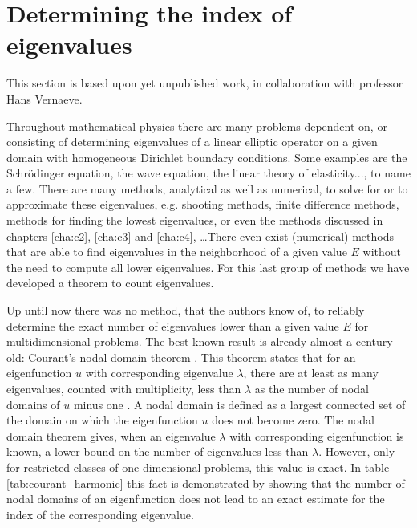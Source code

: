 \section{Determining the index of eigenvalues}\label{sec:c3_index_of_e}

This section is based upon yet unpublished work, in collaboration with professor Hans Vernaeve.


Throughout mathematical physics there are many problems dependent on, or consisting of determining eigenvalues of a linear elliptic operator on a given domain with homogeneous Dirichlet boundary conditions. Some examples are the Schrödinger equation, the wave equation, the linear theory of elasticity..., to name a few. There are many methods, analytical as well as numerical, to solve for or to approximate these eigenvalues, e.g. shooting methods\cite{ixaru_numerical_1984,ixaru_new_2010}, finite difference methods\cite{wang_new_2009}, methods for finding the lowest eigenvalues\cite{braun_efficient_1996}, or even the methods discussed in chapters \ref{cha:c2}, \ref{cha:c3} and \ref{cha:c4}, \dots There even exist (numerical) methods that are able to find eigenvalues in the neighborhood of a given value $E$ without the need to compute all lower eigenvalues. For this last group of methods we have developed a theorem to count eigenvalues.

Up until now there was no method, that the authors know of, to reliably determine the exact number of eigenvalues lower than a given value $E$ for multidimensional problems. The best known result is already almost a century old: Courant's nodal domain theorem \cite[Vol I, Chapter  VI, paragraph 2, Theorem 2]{courant_methods_2008}. This theorem states that for an eigenfunction $u$ with corresponding eigenvalue $\lambda$, there are at least as many eigenvalues, counted with multiplicity, less than $\lambda$ as the number of nodal domains of $u$ minus one \cite[Theorem 1.1]{berard_nodal_2014}. A nodal domain is defined as a largest connected set of the domain on which the eigenfunction $u$ does not become zero. The nodal domain theorem gives, when an eigenvalue $\lambda$ with corresponding eigenfunction is known, a lower bound on the number of eigenvalues less than $\lambda$. However, only for restricted classes of one dimensional problems, this value is exact. In table \ref{tab:courant_harmonic} this fact is demonstrated by showing that the number of nodal domains of an eigenfunction does not lead to an exact estimate for the index of the corresponding eigenvalue.

